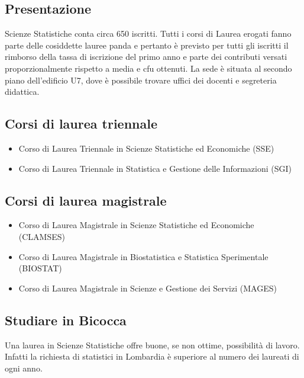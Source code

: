 
\subsection{Presentazione}
Scienze Statistiche conta circa 650 iscritti. Tutti i corsi di Laurea erogati fanno parte delle cosiddette lauree panda e pertanto è previsto per tutti gli iscritti il rimborso della tassa di iscrizione del primo anno e parte dei contributi versati proporzionalmente rispetto a media e cfu ottenuti. 
La sede è situata al secondo piano dell'edificio U7, dove è possibile trovare uffici dei docenti e segreteria didattica.
 
\subsection{Corsi di laurea triennale} 

\begin{itemize}
\item Corso di Laurea Triennale in Scienze Statistiche ed Economiche (SSE) 
\item Corso di Laurea Triennale in Statistica e Gestione delle Informazioni (SGI) 
\end{itemize}

\subsection{Corsi di laurea magistrale}
\begin{itemize}
\item Corso di Laurea Magistrale in Scienze Statistiche ed Economiche (CLAMSES) 
\item Corso di Laurea Magistrale in Biostatistica e Statistica Sperimentale (BIOSTAT)
\item Corso di Laurea Magistrale in Scienze e Gestione dei Servizi (MAGES)
\end{itemize}

\subsection{Studiare in Bicocca}
Una laurea in Scienze Statistiche offre buone, se non ottime, possibilità di lavoro. Infatti la richiesta di statistici in Lombardia è superiore al numero dei laureati di ogni anno. 

